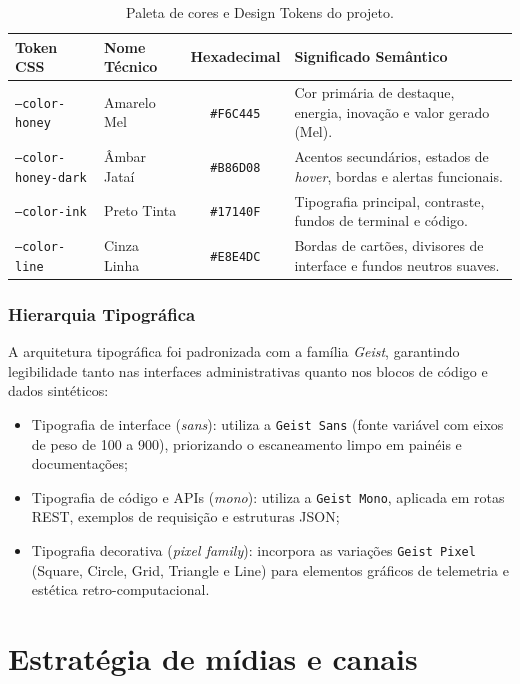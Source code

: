\documentclass[
  12pt,
  openright,
  oneside,
  a4paper,
  brazilian
]{abntex2}
\begin{document}
\begin{table}[htbp]
\centering
\caption{Paleta de cores e Design Tokens do projeto.}
\label{tab:paleta_cores}
\begin{tabular}{|l|l|c|p{5.5cm}|}
\hline
\textbf{Token CSS} & \textbf{Nome Técnico} & \textbf{Hexadecimal} & \textbf{Significado Semântico} \\ \hline
\texttt{--color-honey} & Amarelo Mel & \texttt{\#F6C445} & Cor primária de destaque, energia, inovação e valor gerado (Mel). \\ \hline
\texttt{--color-honey-dark} & Âmbar Jataí & \texttt{\#B86D08} & Acentos secundários, estados de \textit{hover}, bordas e alertas funcionais. \\ \hline
\texttt{--color-ink} & Preto Tinta & \texttt{\#17140F} & Tipografia principal, contraste, fundos de terminal e código. \\ \hline
\texttt{--color-line} & Cinza Linha & \texttt{\#E8E4DC} & Bordas de cartões, divisores de interface e fundos neutros suaves. \\ \hline
\end{tabular}
\end{table}

\subsubsection{Hierarquia Tipográfica}

A arquitetura tipográfica foi padronizada com a família \textit{Geist}, garantindo legibilidade tanto nas interfaces administrativas quanto nos blocos de código e dados sintéticos:

\begin{itemize}
    \item{Tipografia de interface (\textit{sans}):} utiliza a \texttt{Geist Sans} (fonte variável com eixos de peso de 100 a 900), priorizando o escaneamento limpo em painéis e documentações;
    \item{Tipografia de código e APIs (\textit{mono}):} utiliza a \texttt{Geist Mono}, aplicada em rotas REST, exemplos de requisição e estruturas JSON;
    \item{Tipografia decorativa (\textit{pixel family}):} incorpora as variações \texttt{Geist Pixel} (Square, Circle, Grid, Triangle e Line) para elementos gráficos de telemetria e estética retro-computacional.
\end{itemize}

\section{Estratégia de mídias e canais}
\label{sec:estratégia_redes_sociais}
\end{document}
